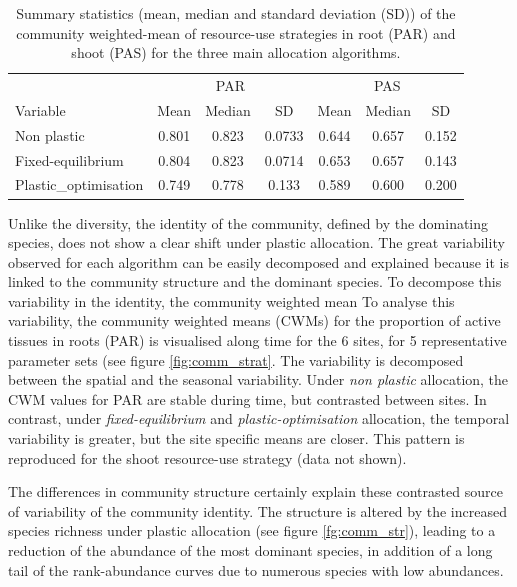 \begin{table}[]
\centering
\caption[Tissue resource-use strategy at the community level]{Summary statistics (mean, median and standard deviation (SD)) of the community weighted-mean of resource-use strategies in root (PAR) and shoot (PAS) for the three main allocation algorithms.}
\label{table:comm_strat}
\begin{tabular}{l|ccc|ccc}
                      & \multicolumn{3}{c}{PAR} & \multicolumn{3}{c}{PAS} \\
Variable              & Mean  & Median & SD     & Mean   & Median  & SD    \\ \hline
Non plastic           & 0.801 & 0.823  & 0.0733 & 0.644  & 0.657   & 0.152 \\
Fixed-equilibrium     & 0.804 & 0.823  & 0.0714 & 0.653  & 0.657   & 0.143 \\
Plastic\_optimisation & 0.749 & 0.778  & 0.133  & 0.589  & 0.600   & 0.200
\end{tabular}
\end{table}


Unlike the diversity, the identity of the community, defined by the dominating species, does not show a clear shift under plastic allocation. The great variability observed for each algorithm can be easily decomposed and explained because it is linked to the community structure and the dominant species. To decompose this variability in the identity, the community weighted mean 
To analyse this variability, the community weighted means (CWMs) for the proportion of active tissues in roots (PAR) is visualised along time for the 6 sites, for 5 representative parameter sets (see figure \ref{fig:comm_strat}. The variability is decomposed between the spatial and the seasonal variability. Under \textit{non plastic} allocation, the CWM values for PAR are stable during time, but contrasted between sites. In contrast, under \textit{fixed-equilibrium} and \textit{plastic-optimisation} allocation, the temporal variability is greater, but the site specific means are closer. This pattern is reproduced for the shoot resource-use strategy (data not shown).


The differences in community structure certainly explain these contrasted source of variability of the community identity. The structure is altered by the increased species richness under plastic allocation (see figure \ref{fg:comm_str}), leading to a reduction of the abundance of the most dominant species, in addition of a long tail of the rank-abundance curves due to numerous species with low abundances.

